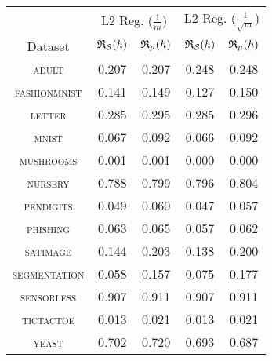 \begin{tabular}{c|cc|cc}
\toprule
  & \multicolumn{2}{c}{L2 Reg. {\small ($\frac{1}{m}$)}} & \multicolumn{2}{c}{L2 Reg. {\small ($\frac{1}{\sqrt{m}}$)}} \\
Dataset & {\scriptsize $\mathfrak{R}_{\mathcal{S}}(h)$} & {\scriptsize $\mathfrak{R}_{\mu}(h)$} & {\scriptsize $\mathfrak{R}_{\mathcal{S}}(h)$} & {\scriptsize $\mathfrak{R}_{\mu}(h)$} \\
\midrule
\textsc{\footnotesize adult} & 0.207 & 0.207 & 0.248 & 0.248 \\
\textsc{\footnotesize fashionmnist} & 0.141 & 0.149 & 0.127 & 0.150 \\
\textsc{\footnotesize letter} & 0.285 & 0.295 & 0.285 & 0.296 \\
\textsc{\footnotesize mnist} & 0.067 & 0.092 & 0.066 & 0.092 \\
\textsc{\footnotesize mushrooms} & 0.001 & 0.001 & 0.000 & 0.000 \\
\textsc{\footnotesize nursery} & 0.788 & 0.799 & 0.796 & 0.804 \\
\textsc{\footnotesize pendigits} & 0.049 & 0.060 & 0.047 & 0.057 \\
\textsc{\footnotesize phishing} & 0.063 & 0.065 & 0.057 & 0.062 \\
\textsc{\footnotesize satimage} & 0.144 & 0.203 & 0.138 & 0.200 \\
\textsc{\footnotesize segmentation} & 0.058 & 0.157 & 0.075 & 0.177 \\
\textsc{\footnotesize sensorless} & 0.907 & 0.911 & 0.907 & 0.911 \\
\textsc{\footnotesize tictactoe} & 0.013 & 0.021 & 0.013 & 0.021 \\
\textsc{\footnotesize yeast} & 0.702 & 0.720 & 0.693 & 0.687 \\
\bottomrule
\end{tabular}